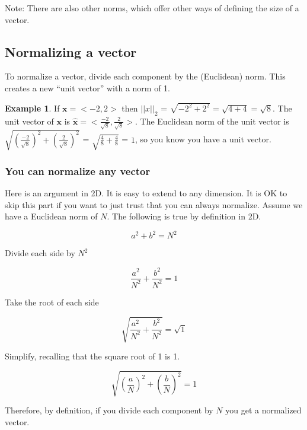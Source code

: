 \documentclass[]{article}
\theoremstyle{definition}
\newtheorem{exmp}{Example}[section]
\begin{document}
\noindent Note: There are also other norms, which offer other ways of defining the size of a vector.

\subsection{Normalizing a vector}

To normalize a vector, divide each component by the (Euclidean) norm. This creates a new ``unit vector'' with a norm of 1.

\begin{exmp}
If $ \mathbf{x}=<-2,2> $ then  $\vert \vert x \vert \vert_2$ = $\sqrt{-2^2 + 2^2} = \sqrt{4 + 4}  = \sqrt{8}$. The unit vector of $ \mathbf{x}$ is $ \mathbf{\hat{x}}=<\frac{-2}{\sqrt{8}},\frac{2}{\sqrt{8}}> $. The Euclidean norm of the unit vector is $\sqrt{(\frac{-2}{\sqrt{8}})^2 + (\frac{2}{\sqrt{8}})^2}$ = $\sqrt{\frac{4}{8} + \frac{4}{8}}$ = $1$, so you know you have a unit vector. 
\end{exmp}

\subsubsection{You can normalize any vector}
Here is an argument in 2D. It is easy to extend to any dimension. It is OK to skip this part if you want to just trust that you can always normalize. Assume we have a Euclidean norm of $N$. The following is true by definition in 2D.

\begin{equation}
a^2 + b^2 = N^2 
\end{equation}

Divide each side by $N^2$

\begin{equation}
\frac{a^2}{N^2} + \frac{b^2}{N^2} = 1
\end{equation}

Take the root of each side

\begin{equation}
\sqrt{\frac{a^2}{N^2} + \frac{b^2}{N^2}} = \sqrt{1}
\end{equation}

Simplify, recalling that the square root of 1 is 1.

\begin{equation}
\sqrt{(\frac{a}{N})^2 + (\frac{b}{N})^2} = 1
\end{equation}

Therefore, by definition, if you divide each component by $N$ you get a normalized vector.
\end{document}
